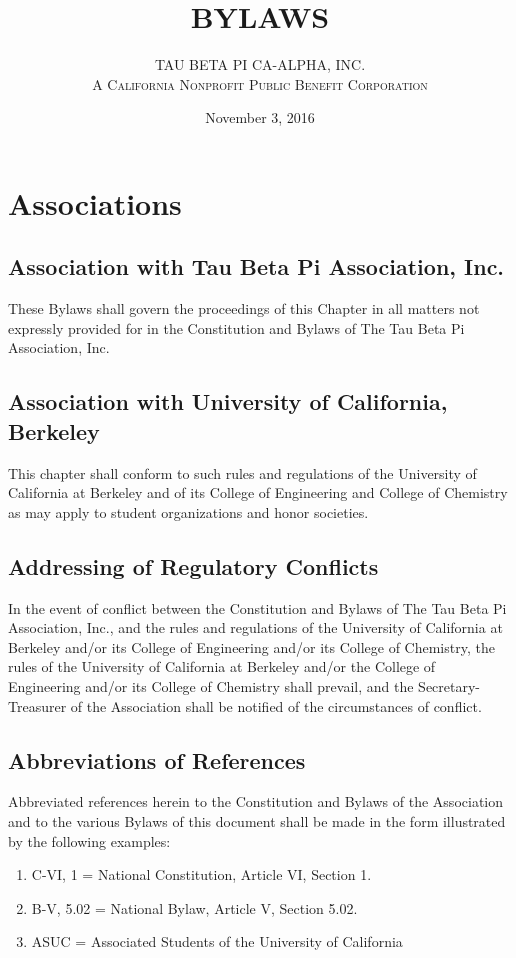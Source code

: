 \documentclass{article}
\begin{document}
	\title{\textbf {\uppercase{Bylaws}}}
	\author{\uppercase{Tau Beta Pi CA-Alpha, Inc.} \\ \textsc{A California Nonprofit Public Benefit Corporation}}
	\date{November 3, 2016}
	\maketitle
	\clearpage


	\section{Associations}
	\subsection{Association with Tau Beta Pi Association, Inc.}
	These Bylaws shall govern the proceedings of this Chapter in all matters not expressly provided for in the Constitution and Bylaws of The Tau Beta Pi Association, Inc.
	\subsection{Association with University of California, Berkeley}
	This chapter shall conform to such rules and regulations of the University of California at Berkeley and of its College of Engineering and College of Chemistry as may apply to student organizations and honor societies.
	\subsection{Addressing of Regulatory Conflicts}
	In the event of conflict between the Constitution and Bylaws of The Tau Beta Pi Association, Inc., and the rules and regulations of the University of California at Berkeley and/or its College of Engineering and/or its College of Chemistry, the rules of the University of California at Berkeley and/or the College of Engineering and/or its College of Chemistry shall prevail, and the Secretary- Treasurer of the Association shall be notified of the circumstances of conflict.
	\subsection{Abbreviations of References}
	Abbreviated references herein to the Constitution and Bylaws of the Association and to the various Bylaws of this document shall be made in the form illustrated by the following examples:
	\begin{enumerate}[\indent a)]
	\item C-VI, 1 = National Constitution, Article VI, Section 1. 
	\item B-V, 5.02 = National Bylaw, Article V, Section 5.02.
	\item ASUC = Associated Students of the University of California 
	\end{enumerate}
	
\end{document}
